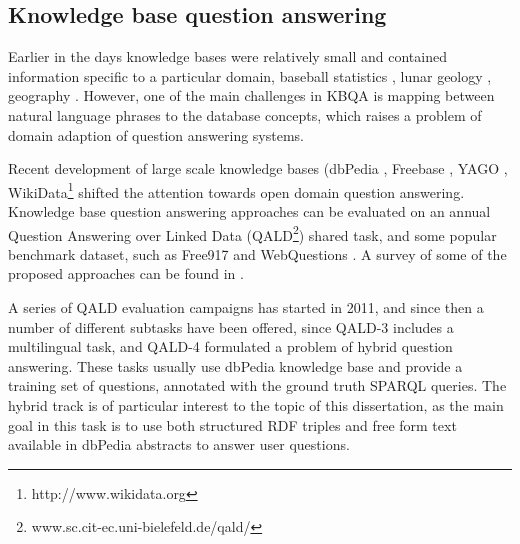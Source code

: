 \subsection{Knowledge base question answering}
\label{sec:rel_work:factoid:kb}

Earlier in the days knowledge bases were relatively small and contained information specific to a particular domain, \eg baseball statistics \cite{green1961baseball}, lunar geology \cite{woods1977lunar}, geography \cite{zelle1996learning}.
However, one of the main challenges in KBQA is mapping between natural language phrases to the database concepts, which raises a problem of domain adaption of question answering systems.

Recent development of large scale knowledge bases (\eg dbPedia \cite{auer2007dbpedia}, Freebase \cite{Bollacker:2008:FCC:1376616.1376746}, YAGO \cite{suchanek2007yago}, WikiData\footnote{http://www.wikidata.org} shifted the attention towards open domain question answering.
Knowledge base question answering approaches can be evaluated on an annual Question Answering over Linked Data (QALD\footnote{www.sc.cit-ec.uni-bielefeld.de/qald/}) shared task, and some popular benchmark dataset, such as Free917 \cite{cai2013large} and WebQuestions \cite{BerantCFL13:sempre}.
A survey of some of the proposed approaches can be found in \cite{unger2014introduction}.

A series of QALD evaluation campaigns has started in 2011, and since then a number of different subtasks have been offered, \ie since QALD-3 includes a multilingual task, and QALD-4 formulated a problem of hybrid question answering.
These tasks usually use dbPedia knowledge base and provide a training set of questions, annotated with the ground truth SPARQL queries.
The hybrid track is of particular interest to the topic of this dissertation, as the main goal in this task is to use both structured RDF triples and free form text available in dbPedia abstracts to answer user questions.


